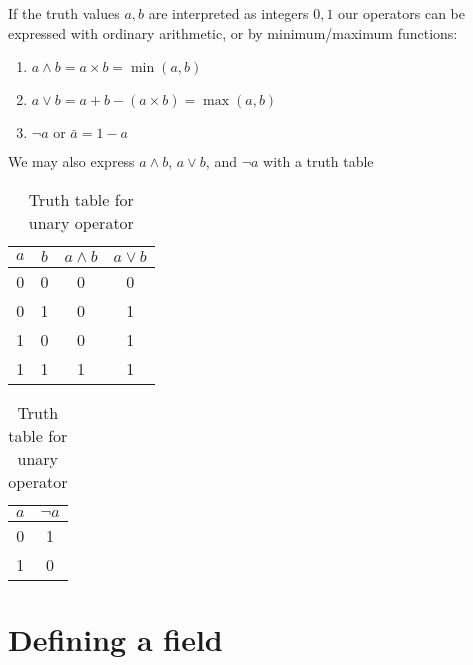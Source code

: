 \documentclass{article}
\begin{document}
If the truth values $a, b$ are interpreted as integers $0, 1$ our operators can
be expressed with ordinary arithmetic, or by minimum/maximum functions:
\begin{enumerate}
  \item $a \wedge b = a \times b = \min(a,b)$
  \item $a \vee b = a + b - (a \times b) = \max(a,b)$
  \item $\neg a\text{ or }\bar{a} = 1 - a$
\end{enumerate}
We may also express $a \wedge b$, $a \vee b$, and $\neg a$ with a truth table

\begin{table}[]
\parbox{.45\linewidth}{
\centering
\begin{tabular}{@{}c c c c @{}}
\toprule
$a$ & $b$ & $a \wedge b$ & $a \vee b$ \\ \toprule
0   & 0   & 0            & 0          \\ \midrule
0   & 1   & 0            & 1          \\ \midrule
1   & 0   & 0            & 1          \\ \midrule
1   & 1   & 1            & 1          \\ \bottomrule
\end{tabular}
\caption{Truth table for binary operators}
}
\hfill
\parbox{.45\linewidth}{
\centering
\begin{tabular}{@{} c c @{}}
\toprule
$a$ & $\neg a$ \\ \toprule
0   & 1        \\ \midrule
1   & 0        \\ \bottomrule
\end{tabular}
\caption{Truth table for unary operator }
}
\end{table}

\section{Defining a field}
\label{sec:Defining a field}
\end{document}

